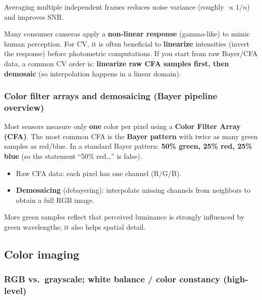 \documentclass[11pt,a4paper]{article}
\begin{document}
\begin{intbox}
Averaging multiple independent frames reduces noise variance (roughly $\propto 1/n$) and improves SNR.
\end{intbox}

\begin{notebox}
Many consumer cameras apply a \textbf{non-linear response} (gamma-like) to mimic human perception.
For CV, it is often beneficial to \textbf{linearize} intensities (invert the response) before photometric computations.
If you start from raw Bayer/CFA data, a common CV order is: \textbf{linearize raw CFA samples first, then demosaic} (so interpolation happens in a linear domain).
\end{notebox}


\subsubsection{Color filter arrays and demosaicing (Bayer pipeline overview)}

\begin{defbox}
Most sensors measure only \textbf{one} color per pixel using a \textbf{Color Filter Array (CFA)}.
The most common CFA is the \textbf{Bayer pattern} with twice as many green samples as red/blue. In a standard Bayer pattern: \textbf{50\% green, 25\% red, 25\% blue} (so the statement “50\% red…” is false).
\end{defbox}

\begin{itemize}
  \item Raw CFA data: each pixel has one channel (R/G/B).
  \item \textbf{Demosaicing} (debayering): interpolate missing channels from neighbors to obtain a full RGB image.
\end{itemize}

\begin{notebox}
More green samples reflect that perceived luminance is strongly influenced by green wavelengths; it also helps spatial detail.
\end{notebox}



\subsection{Color imaging}

\subsubsection{RGB vs.\ grayscale; white balance / color constancy (high-level)}
\end{document}
